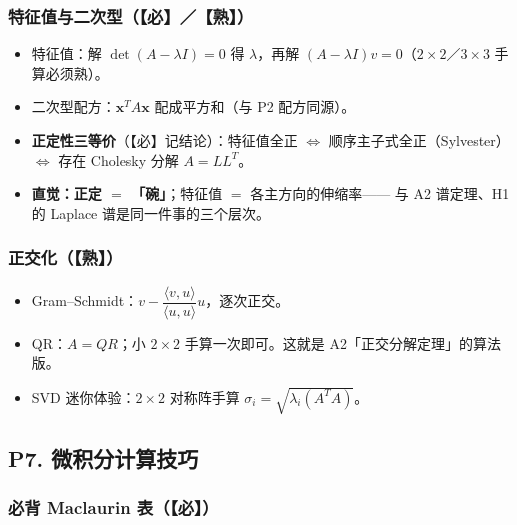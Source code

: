 \subsubsection{特征值与二次型（【必】／【熟】）}

\begin{itemize}
  \item 特征值：解 $\det(A-\lambda I)=0$ 得 $\lambda$，再解 $(A-\lambda I)v=0$（$2\times2$／$3\times3$ 手算必须熟）。
  \item 二次型配方：$\mathbf{x}^TA\mathbf{x}$ 配成平方和（与 P2 配方同源）。
  \item \textbf{正定性三等价}（【必】记结论）：特征值全正 $\iff$ 顺序主子式全正（Sylvester）
        $\iff$ 存在 Cholesky 分解 $A=LL^T$。
  \item \textbf{直觉：正定 $=$ 「碗」}；特征值 $=$ 各主方向的伸缩率——
        与 A2 谱定理、H1 的 Laplace 谱是同一件事的三个层次。
\end{itemize}

\subsubsection{正交化（【熟】）}

\begin{itemize}
  \item Gram--Schmidt：$v-\dfrac{\langle v,u\rangle}{\langle u,u\rangle}u$，逐次正交。
  \item QR：$A=QR$；小 $2\times2$ 手算一次即可。这就是 A2「正交分解定理」的算法版。
  \item SVD 迷你体验：$2\times2$ 对称阵手算 $\sigma_i=\sqrt{\lambda_i(A^TA)}$。
\end{itemize}

\subsection{P7. 微积分计算技巧}

\subsubsection{必背 Maclaurin 表（【必】）}

